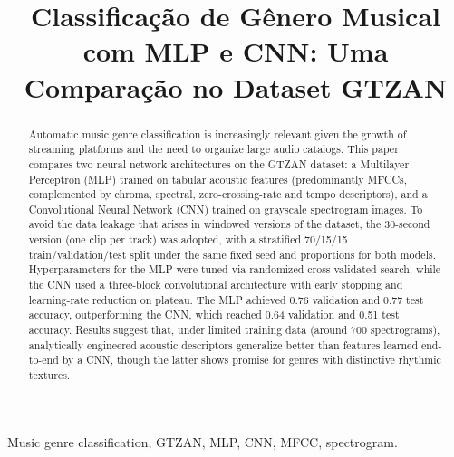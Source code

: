 \documentclass[conference]{IEEEtran}
\begin{document}
	
	\title{Classificação de Gênero Musical com MLP e CNN: Uma Comparação no Dataset GTZAN}
	
	\author{
		\vspace{0.5em}
	}
	
	\maketitle
	
	\renewcommand{\abstractname}{Abstract}
	\begin{abstract}
		Automatic music genre classification is increasingly relevant given the growth of streaming platforms and the need to organize large audio catalogs. This paper compares two neural network architectures on the GTZAN dataset: a Multilayer Perceptron (MLP) trained on tabular acoustic features (predominantly MFCCs, complemented by chroma, spectral, zero-crossing-rate and tempo descriptors), and a Convolutional Neural Network (CNN) trained on grayscale spectrogram images. To avoid the data leakage that arises in windowed versions of the dataset, the 30-second version (one clip per track) was adopted, with a stratified 70/15/15 train/validation/test split under the same fixed seed and proportions for both models. Hyperparameters for the MLP were tuned via randomized cross-validated search, while the CNN used a three-block convolutional architecture with early stopping and learning-rate reduction on plateau. The MLP achieved 0.76 validation and 0.77 test accuracy, outperforming the CNN, which reached 0.64 validation and 0.51 test accuracy. Results suggest that, under limited training data (around 700 spectrograms), analytically engineered acoustic descriptors generalize better than features learned end-to-end by a CNN, though the latter shows promise for genres with distinctive rhythmic textures.
	\end{abstract}
	
	\renewcommand{\IEEEkeywordsname}{Keywords}
	\begin{IEEEkeywords}
		Music genre classification, GTZAN, MLP, CNN, MFCC, spectrogram.
	\end{IEEEkeywords}
	
\end{document}
